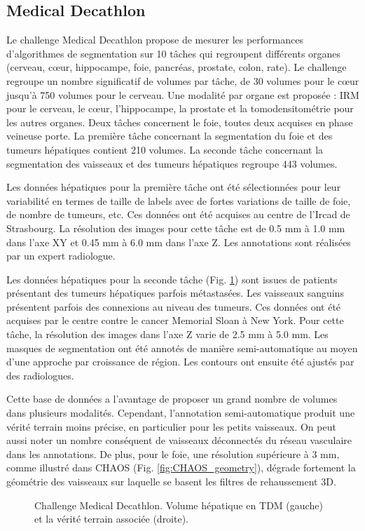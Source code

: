 \subsection{Medical Decathlon}
Le challenge Medical Decathlon propose de mesurer les performances d'algorithmes de segmentation sur 10 tâches qui regroupent différents organes (cerveau, cœur, hippocampe, foie, pancréas, prostate, colon, rate). Le challenge regroupe un nombre significatif de volumes par tâche, de 30 volumes pour le cœur jusqu'à 750 volumes pour le cerveau. Une modalité par organe est proposée : IRM pour le cerveau, le cœur, l'hippocampe, la prostate et la tomodensitométrie pour les autres organes. Deux tâches concernent le foie, toutes deux acquises en phase veineuse porte. La première tâche concernant la segmentation du foie et des tumeurs hépatiques contient 210 volumes. La seconde tâche concernant la segmentation des vaisseaux et des tumeurs hépatiques regroupe 443 volumes.

Les données hépatiques pour la première tâche ont été sélectionnées pour leur variabilité en termes de taille de labels avec de fortes variations de taille de foie, de nombre de tumeurs, etc. Ces données ont été acquises au centre de l'Ircad de Strasbourg. La résolution des images pour cette tâche est de 0.5 mm à 1.0 mm dans l'axe XY et 0.45 mm à 6.0 mm dans l'axe Z. Les annotations sont réalisées par un expert radiologue.

Les données hépatiques pour la seconde tâche (Fig. \ref{fig:MD_examples}) sont issues de patients présentant des tumeurs hépatiques parfois métastasées. Les vaisseaux sanguins présentent parfois des connexions au niveau des tumeurs. Ces données ont été acquises par le centre contre le cancer Memorial Sloan à New York. Pour cette tâche, la résolution des images dans l'axe Z varie de 2.5 mm à 5.0 mm. Les masques de segmentation ont été annotés de manière semi-automatique au moyen d'une approche par croissance de région. Les contours ont ensuite été ajustés par des radiologues.

Cette base de données a l'avantage de proposer un grand nombre de volumes dans plusieurs modalités. Cependant, l'annotation semi-automatique produit une vérité terrain moins précise, en particulier pour les petits vaisseaux. On peut aussi noter un nombre conséquent de vaisseaux déconnectés du réseau vasculaire dans les annotations. De plus, pour le foie, une résolution supérieure à 3 mm, comme illustré dans CHAOS (Fig. \ref{fig:CHAOS_geometry}), dégrade fortement la géométrie des vaisseaux sur laquelle se basent les filtres de rehaussement 3D.
\begin{figure}
    \centering
    \caption{Challenge Medical Decathlon. Volume hépatique en TDM (gauche) et la vérité terrain associée (droite).}
    \label{fig:MD_examples}
\end{figure}

